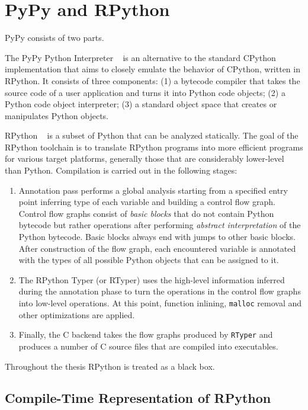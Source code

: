 \chapter{PyPy and RPython}
PyPy consists of two parts.

The PyPy Python Interpreter ~\cite{pypy-intro} is an alternative to the standard CPython implementation that aims to closely emulate the behavior of CPython, written in RPython. It consists of three components: (1) a bytecode compiler that takes the source code of a user application and turns it into Python code objects; (2) a Python code object interpreter; (3) a standard object space that creates or manipulates Python objects.

RPython ~\cite{rpython-doc} is a subset of Python that can be analyzed statically. The goal of the RPython toolchain is to translate RPython programs into more efficient programs for various target platforms, generally those that are considerably lower-level than Python. Compilation is carried out in the following stages:

\begin{enumerate}
\item Annotation pass performs a global analysis starting from a specified entry point inferring type of each variable and building a control flow graph. Control flow graphs consist of \textit{basic blocks} that do not contain Python bytecode but rather operations after performing \textit{abstract interpretation} of the Python bytecode. Basic blocks always end with jumps to other basic blocks. After construction of the flow graph, each encountered variable is annotated with the types of all possible Python objects that can be assigned to it.

\item
The RPython Typer (or RTyper) uses the high-level information inferred during the annotation phase to turn the operations in the control flow graphs into low-level operations. At this point, function inlining, \texttt{malloc} removal and other optimizations are applied.

\item
Finally, the C backend takes the flow graphs produced by \texttt{RTyper} and produces a number of C source files that are compiled into executables.
\end{enumerate}

Throughout the thesis RPython is treated as a black box.

\section{Compile-Time Representation of RPython}

